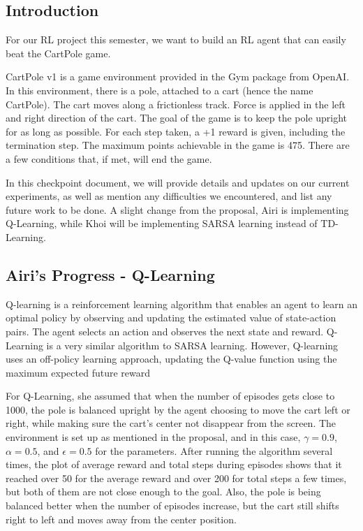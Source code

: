 \documentclass[nohyperref]{article}
\theoremstyle{plain}
\theoremstyle{definition}
\theoremstyle{remark}
\begin{document}

\subsection*{Introduction}

For our RL project this semester, we want to build an RL agent that can easily beat the CartPole game.  

CartPole v1 is a game environment provided in the Gym package from OpenAI. In this environment, there is a pole, attached to a cart (hence the name CartPole). The cart moves along a frictionless track. Force is applied in the left and right direction of the cart.
The goal of the game is to keep the pole upright for as long as possible. For each step taken, a +1 reward is given, including the termination step. The maximum points achievable in the game is 475. There are a few conditions that, if met, will end the game.

In this checkpoint document, we will provide details and updates on our current experiments, as well as mention any difficulties we encountered, and list any future work to be done. A slight change from the proposal, Airi is implementing Q-Learning, while Khoi will be implementing SARSA learning instead of TD-Learning.

\subsection*{Airi's Progress - Q-Learning}
Q-learning is a reinforcement learning algorithm that enables an agent to learn an optimal policy by observing and updating the estimated value of state-action pairs. 
The agent selects an action and observes the next state and reward.
Q-Learning is a very similar algorithm to SARSA learning. However, Q-learning uses an off-policy learning approach, updating the Q-value function using the maximum expected future reward

For Q-Learning, she assumed that when the number of episodes gets close to 1000, the pole is balanced upright by the agent choosing to move the cart left or right, while making sure the cart's center not disappear from the screen. 
The environment is set up as mentioned in the proposal, and in this case, $\gamma = 0.9$, $\alpha = 0.5$, and $\epsilon = 0.5$ for the parameters.  
After running the algorithm several times, the plot of average reward and total steps during episodes shows that it reached over 50 for the average reward and over 200 for total steps a few times, but both of them are not close enough to the goal.
Also, the pole is being balanced better when the number of episodes increase, but the cart still shifts right to left and moves away from the center position.
\end{document}
